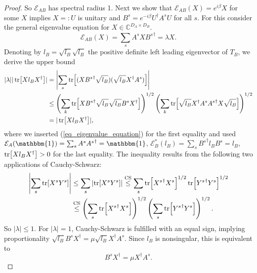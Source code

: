 \begin{proof}
\noindent So $\mathcal{E}_{AB}$ has spectral radius 1. Next we show that $\mathcal{E}_{AB}(X) = e^{i\beta}X$ for some $X$ implies $X =: U$ is unitary and $B^s = e^{-i\beta}U^{\dagger} A^s U$ for all $s$. For this consider the general eigenvalue equation for $X \in \mathbb{C}^{D_A \times D_B}$.
\begin{equation}\label{eq_eigenvalue_equation}
	\mathcal{E}_{AB}(X) = \sum_s A^s X {B^s}^{\dagger} = \lambda X.
\end{equation}
Denoting by $l_B = \sqrt{l_B}\sqrt{l_B}$ the positive definite left leading eigenvector of $T_B$, we derive the upper bound
\begin{align}
\begin{split}
	\vert \lambda \vert \vert \tr[X l_B X^{\dagger}] \vert &= \left\vert \sum_s \tr[(X {B^s}^{\dagger} \sqrt{l_B})(\sqrt{l_B} X^{\dagger} A^s)] \right\vert \\
	&\leq \left(\sum_k\tr[X {B^s}^{\dagger} \sqrt{l_B} \sqrt{l_B} B^s X^{\dagger}]\right)^{1/2}\left(\sum_k\tr[\sqrt{l_B} X^{\dagger} A^s {A^s}^{\dagger} X \sqrt{l_B}]\right)^{1/2} \\
	&= \vert \tr[X l_B X^{\dagger}] \vert,
\end{split}
\end{align}
where we inserted (\ref{eq_eigenvalue_equation}) for the first equality and used $\mathcal{E}_A(\mathbbm{1}) = \sum_s A^s {A^s}^{\dagger} = \mathbbm{1}$, $\mathcal{E}_B^*(l_B) = \sum_s {B^s}^{\dagger} l_B B^s = l_B$, $\tr[X l_B X^{\dagger}] > 0$ for the last equality. The inequality results from the following two applications of Cauchy-Schwarz:
\begin{align}
\begin{split}
	\left\vert \sum_s \tr[X^sY^s] \right\vert &\leq \sum_s \left\vert \tr[X^sY^s] \right\vert \overset{\mathrm{CS}}{\leq} \sum_s \tr[{X^s}^{\dagger}X^s]^{1/2}\tr[{Y^s}^{\dagger} Y^s]^{1/2} \\
	& \overset{\mathrm{CS}}{\leq} \left(\sum_s\tr[{X^s}^{\dagger} X^s]\right)^{1/2}\left(\sum_s\tr[{Y^s}^{\dagger}Y^s]\right)^{1/2}.
\end{split}
\end{align}
So $\vert \lambda \vert \leq 1$. For $\vert \lambda \vert = 1$, Cauchy-Schwarz is fulfilled with an equal sign, implying proportionality $\sqrt{l_B} B^s X^{\dagger} = \mu \sqrt{l_B} X^{\dagger} A^s$. Since $l_B$ is nonsingular, this is equivalent to
\begin{equation}\label{eq_relation_A_B}
	B^s X^{\dagger} = \mu X^{\dagger} A^s.
\end{equation}

\end{proof}
